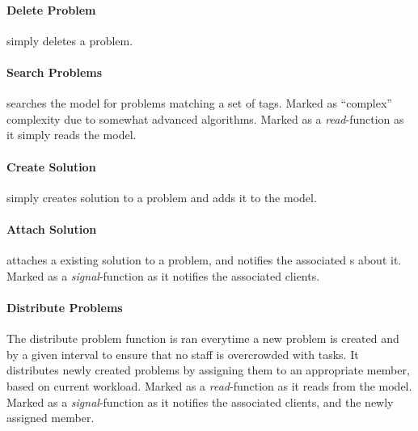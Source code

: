\paragraph{Delete Problem} simply deletes a problem. 

\paragraph{Search Problems} searches the model for problems matching a set of tags. Marked as ``complex'' complexity due to somewhat advanced algorithms. Marked as a \textit{read}-function as it simply reads the model.

\paragraph{Create Solution} simply creates solution to a problem and adds it to the model. 

\paragraph{Attach Solution} attaches a existing solution to a problem, and notifies the associated \client s about it. Marked as a \textit{signal}-function as it notifies the associated clients. 

\paragraph{Distribute Problems} The distribute problem function is ran everytime a new problem is created and by a given interval to ensure that no staff is overcrowded with tasks. 
It distributes newly created problems by assigning them to an appropriate \astaff[] member, based on current workload. %
Marked as a \textit{read}-function as it reads from the model. Marked as a \textit{signal}-function as it notifies the associated clients, and the newly assigned \astaff[] member. 


